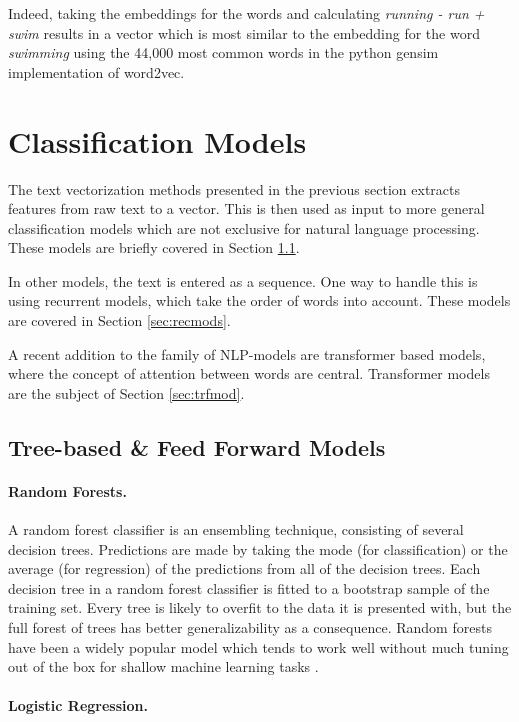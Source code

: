 Indeed, taking the embeddings for the words and calculating \emph{running - run + swim} results in a vector which is most similar to the embedding for the word \emph{swimming} using the 44,000 most common words in the python gensim implementation of word2vec.


\section{Classification Models}

The text vectorization methods presented in the previous section extracts features from raw text to a vector. This is then used as input to more general classification models which are not exclusive for natural language processing. These models are briefly covered in Section \ref{sec:treeff}. 

In other models, the text is entered as a sequence. One way to handle this is using recurrent models, which take the order of words into account. These models are covered in Section \ref{sec:recmods}. 

A recent addition to the family of NLP-models are transformer based models, where the concept of attention between words are central. Transformer models are the subject of Section \ref{sec:trfmod}.

\subsection{Tree-based \& Feed Forward Models}\label{sec:treeff} 

\paragraph{Random Forests.}
A random forest classifier is an ensembling technique, consisting of several decision trees. Predictions are made by taking the mode (for classification) or the average (for regression) of the predictions from all of the decision trees. Each decision tree in a random forest classifier is fitted to a bootstrap sample of the training set. Every tree is likely to overfit to the data it is presented with, but the full forest of trees has better generalizability as a consequence. Random forests have been a widely popular model which tends to work well without much tuning out of the box for shallow machine learning tasks \citep{chollet2017deep}. 

\paragraph{Logistic Regression.}

